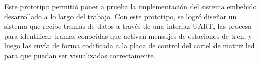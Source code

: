 Este prototipo permitió poner a prueba la implementación del sistema embebido desarrollado a lo largo del trabajo. Con este prototipo, se logró diseñar un sistema que recibe tramas de datos a través de una interfaz UART, las procesa para identificar tramas conocidas que activan mensajes de estaciones de tren, y luego las envía de forma codificada a la placa de control del cartel de matriz led para que puedan ser visualizadas correctamente.\\

%
%
%
